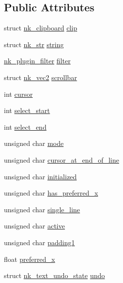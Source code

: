 \subsection*{Public Attributes}
\begin{DoxyCompactItemize}
\item 
struct \mbox{\hyperlink{structnk__clipboard}{nk\+\_\+clipboard}} \mbox{\hyperlink{structnk__text__edit_a739e4da59f61a18ea51f9e17e970316a}{clip}}
\item 
struct \mbox{\hyperlink{structnk__str}{nk\+\_\+str}} \mbox{\hyperlink{structnk__text__edit_a17295dc427008ac289138943c43ac556}{string}}
\item 
\mbox{\hyperlink{nuklear_8h_a7aef0c767e1d06e4b425f4d4e34b7815}{nk\+\_\+plugin\+\_\+filter}} \mbox{\hyperlink{structnk__text__edit_a95a4fd378f171aedcfa8c018d351b5ff}{filter}}
\item 
struct \mbox{\hyperlink{structnk__vec2}{nk\+\_\+vec2}} \mbox{\hyperlink{structnk__text__edit_a36f4775f4ef50cc449212f737e7b5445}{scrollbar}}
\item 
int \mbox{\hyperlink{structnk__text__edit_a40a308833ab82a4fd41aa1ce013d4430}{cursor}}
\item 
int \mbox{\hyperlink{structnk__text__edit_ac9d7d08e64dc391284f87ea54352093d}{select\+\_\+start}}
\item 
int \mbox{\hyperlink{structnk__text__edit_a1bd5ca08f329f2485f0432b52c9093a6}{select\+\_\+end}}
\item 
unsigned char \mbox{\hyperlink{structnk__text__edit_a6d663e082a6944080d86d28a1f5063d7}{mode}}
\item 
unsigned char \mbox{\hyperlink{structnk__text__edit_a731e886c13e4a3a0080dbd6b3594051d}{cursor\+\_\+at\+\_\+end\+\_\+of\+\_\+line}}
\item 
unsigned char \mbox{\hyperlink{structnk__text__edit_a59ae91abb42caf733b9a3af950f9f288}{initialized}}
\item 
unsigned char \mbox{\hyperlink{structnk__text__edit_a3fe57c5d1b054e6e39f6bf4ea634e6ba}{has\+\_\+preferred\+\_\+x}}
\item 
unsigned char \mbox{\hyperlink{structnk__text__edit_a62aa1bf8ccab646b578c15fee5e6e60d}{single\+\_\+line}}
\item 
unsigned char \mbox{\hyperlink{structnk__text__edit_a3d42a1c0032985e789fea827bc46c16a}{active}}
\item 
unsigned char \mbox{\hyperlink{structnk__text__edit_a7f1fd0b23e84fa90c5e5fc439e59f0ce}{padding1}}
\item 
float \mbox{\hyperlink{structnk__text__edit_a701466d8f31b392d4045db0ed1a2103d}{preferred\+\_\+x}}
\item 
struct \mbox{\hyperlink{structnk__text__undo__state}{nk\+\_\+text\+\_\+undo\+\_\+state}} \mbox{\hyperlink{structnk__text__edit_aafeb06f0915d80cd8e4b16e9c3f3ef03}{undo}}
\end{DoxyCompactItemize}


